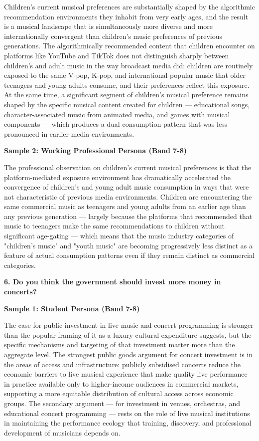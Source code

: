 Children's current musical preferences are substantially shaped by the algorithmic recommendation environments they inhabit from very early ages, and the result is a musical landscape that is simultaneously more diverse and more internationally convergent than children's music preferences of previous generations. The algorithmically recommended content that children encounter on platforms like YouTube and TikTok does not distinguish sharply between children's and adult music in the way broadcast media did: children are routinely exposed to the same V-pop, K-pop, and international popular music that older teenagers and young adults consume, and their preferences reflect this exposure. At the same time, a significant segment of children's musical preference remains shaped by the specific musical content created for children — educational songs, character-associated music from animated media, and games with musical components — which produces a dual consumption pattern that was less pronounced in earlier media environments.

\textbf{Sample 2: Working Professional Persona (Band 7-8)}

The professional observation on children's current musical preferences is that the platform-mediated exposure environment has dramatically accelerated the convergence of children's and young adult music consumption in ways that were not characteristic of previous media environments. Children are encountering the same commercial music as teenagers and young adults from an earlier age than any previous generation — largely because the platforms that recommended that music to teenagers make the same recommendations to children without significant age-gating — which means that the music industry categories of "children's music" and "youth music" are becoming progressively less distinct as a feature of actual consumption patterns even if they remain distinct as commercial categories.

\separator

\begin{ieltsquestion}
\textbf{6. Do you think the government should invest more money in concerts?}
\end{ieltsquestion}
\textbf{Sample 1: Student Persona (Band 7-8)}

The case for public investment in live music and concert programming is stronger than the popular framing of it as a luxury cultural expenditure suggests, but the specific mechanisms and targeting of that investment matter more than the aggregate level. The strongest public goods argument for concert investment is in the areas of access and infrastructure: publicly subsidised concerts reduce the economic barriers to live musical experience that make quality live performance in practice available only to higher-income audiences in commercial markets, supporting a more equitable distribution of cultural access across economic groups. The secondary argument — for investment in venues, orchestras, and educational concert programming — rests on the role of live musical institutions in maintaining the performance ecology that training, discovery, and professional development of musicians depends on.

